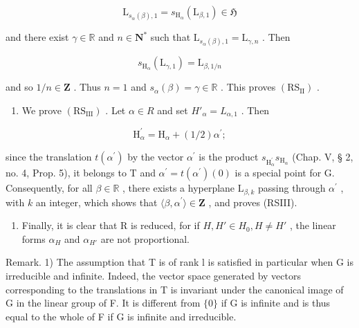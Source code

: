 \[
\mathrm{L} _ {s _ {\alpha} (\beta), 1} = s _ {\mathrm{H} _ {\alpha}} \left(\mathrm{L} _ {\beta , 1}\right) \in \mathfrak {H}
\]

and there exist \(\gamma \in \mathbb{R}\) and \(n\in \mathbf{N}^*\) such that \(\mathrm{L}_{s_{\alpha}(\beta),1} = \mathrm{L}_{\gamma ,n}\) . Then

\[
s _ {\mathrm{H} _ {\alpha}} (\mathrm{L} _ {\gamma , 1}) = \mathrm{L} _ {\beta , 1 / n}
\]

and so \(1 / n\in \mathbf{Z}\) . Thus \(n = 1\) and \(s_{\alpha}(\beta) = \gamma \in \mathbb{R}\) . This proves \((\mathrm{RS}_{\mathrm{II}})\) .

\begin{enumerate}
\def\labelenumi{\alph{enumi})}
\setcounter{enumi}{2}
\tightlist
\item
  We prove \((\mathrm{RS}_{\mathrm{III}})\) . Let \(\alpha \in R\) and set \(H'_{\alpha} = L_{\alpha,1}\) . Then
\end{enumerate}

\[
\mathrm{H} _ {\alpha} ^ {\prime} = \mathrm{H} _ {\alpha} + (1 / 2) \alpha^ {\prime};
\]

since the translation \(t(\alpha^{\prime})\) by the vector \(\alpha^{\prime}\) is the product \(s_{\mathrm{H}_{\alpha}^{\prime}}s_{\mathrm{H}_{\alpha}}\) (Chap. V, § 2, no. 4, Prop. 5), it belongs to T and \(\alpha^{\prime} = t(\alpha^{\prime})(0)\) is a special point for G. Consequently, for all \(\beta \in \mathbb{R}\) , there exists a hyperplane \(\mathrm{L}_{\beta,k}\) passing through \(\alpha^{\prime}\) , with \(k\) an integer, which shows that \(\langle \beta ,\alpha^{\prime}\rangle \in \mathbf{Z}\) , and proves (RSIII).

\begin{enumerate}
\def\labelenumi{\alph{enumi})}
\setcounter{enumi}{3}
\tightlist
\item
  Finally, it is clear that R is reduced, for if \(H, H' \in H_{0}, H \neq H'\) , the linear forms \(\alpha_{H}\) and \(\alpha_{H'}\) are not proportional.
\end{enumerate}

Remark. 1) The assumption that T is of rank l is satisfied in particular when G is irreducible and infinite. Indeed, the vector space generated by vectors corresponding to the translations in T is invariant under the canonical image of G in the linear group of F. It is different from \(\{0\}\) if G is infinite and is thus equal to the whole of F if G is infinite and irreducible.

